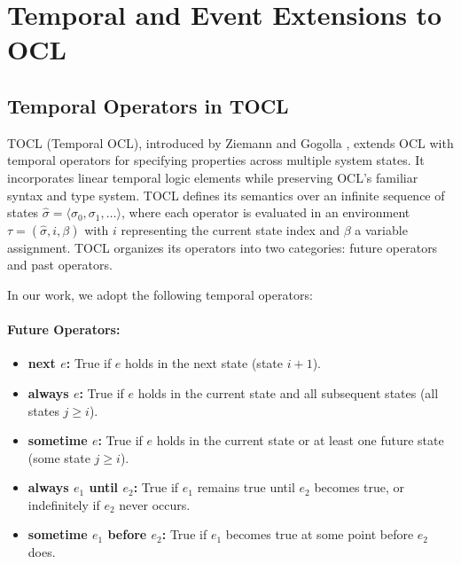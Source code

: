 \section{Temporal and Event Extensions to OCL}

\subsection{Temporal Operators in TOCL}

\hspace{1cm} TOCL (Temporal OCL), introduced by Ziemann and Gogolla \cite{TOCL}, 
extends OCL with temporal operators for specifying properties across multiple system 
states. It incorporates linear temporal logic elements while preserving OCL's familiar 
syntax and type system. TOCL defines its semantics over an infinite sequence of states 
$\hat{\sigma} = \langle \sigma_0, \sigma_1, \ldots \rangle$, where each operator is 
evaluated in an environment $\tau = (\hat{\sigma}, i, \beta)$ with $i$ representing 
the current state index and $\beta$ a variable assignment. TOCL organizes its operators 
into two categories: future operators and past operators.

In our work, we adopt the following temporal operators:

\paragraph{Future Operators:} 
\begin{itemize} 
    \item \textbf{next $e$:} True if $e$ holds in the next state (state $i+1$). 
    \item \textbf{always $e$:} True if $e$ holds in the current state and all subsequent states (all states $j \geq i$). 
    \item \textbf{sometime $e$:} True if $e$ holds in the current state or at least one future state (some state $j \geq i$). 
    \item \textbf{always $e_1$ until $e_2$:} True if $e_1$ remains true until $e_2$ becomes true, or indefinitely if $e_2$ never occurs. 
    \item \textbf{sometime $e_1$ before $e_2$:} True if $e_1$ becomes true at some point before $e_2$ does. 
\end{itemize}

